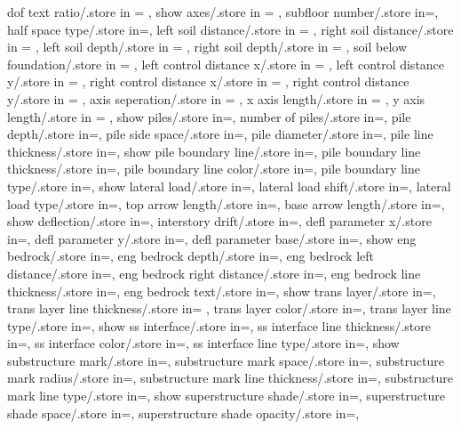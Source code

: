 {  dof text ratio/.store in = \doftextratio,
  show axes/.store in = \showaxes,
  subfloor number/.store in=\subfloors,
  half space type/.store in=\halfspacetype,
  left soil distance/.store in = \leftsoildist,
  right soil distance/.store in = \rightsoildist,
  left soil depth/.store in = \leftsoildepth,
  right soil depth/.store in = \rightsoildepth,
  soil below foundation/.store in = \soilbelowfound,
  left control distance x/.store in = \leftcontrolx,
  left control distance y/.store in = \leftcontroly,
  right control distance x/.store in = \rightcontrolx,
  right control distance y/.store in = \rightcontroly,
  axis seperation/.store in = \axisseperation,
  x axis length/.store in = \axeslenX,
  y axis length/.store in = \axeslenY,
  show piles/.store in=\showpiles,
  number of piles/.store in=\numberofpiles,
  pile depth/.store in=\piledepth,
  pile side space/.store in=\pilesidespace,
  pile diameter/.store in=\pilediameter,
  pile line thickness/.store in=\pilelinethickness,
  show pile boundary line/.store in=\showpbline,
  pile boundary line thickness/.store in=\pblinet,
  pile boundary line color/.store in=\pblinecolor,
  pile boundary line type/.store in=\pblinetype,
  show lateral load/.store in=\showlatload,
  lateral load shift/.store in=\latloadshift,
  lateral load type/.store in=\latloadtype,
  top arrow length/.store in=\toparrlen,
  base arrow length/.store in=\basearrlen,
  show deflection/.store in=\showdefl, 
  interstory drift/.store in=\drift,
  defl parameter x/.store in=,
  defl parameter y/.store in=,
  defl parameter base/.store in=,
  show eng bedrock/.store in=\showengbedrock,
  eng bedrock depth/.store in=\engbedrockdepth,
  eng bedrock left distance/.store in=\engbedrockleftdist,
  eng bedrock right distance/.store in=\engbedrockrightdist,
  eng bedrock line thickness/.store in=\engbedrocklinewidth,
  eng bedrock text/.store in=\engbedrocktext,
  show trans layer/.store in=\showtranslayer,
  trans layer line thickness/.store in= \translayerlinet,
  trans layer color/.store in=\translayercolor,
  trans layer line type/.store in=\translayerlinetype,
  show ss interface/.store in=\showssinter,
  ss interface line thickness/.store in=\ssinterlinet,
  ss interface color/.store in=\ssintercolor,
  ss interface line type/.store in=\ssinterlinetype,
  show substructure mark/.store in=\showmarkss,
  substructure mark space/.store in=\markssexspace,
  substructure mark radius/.store in=\markssrad,
  substructure mark line thickness/.store in=\marksslinet,
  substructure mark line type/.store in=\marksslinetype,
  show superstructure shade/.store in=\showsupershade,
  superstructure shade space/.store in=\supershadespace,
  superstructure shade opacity/.store in=\supershadeopacity,
}
